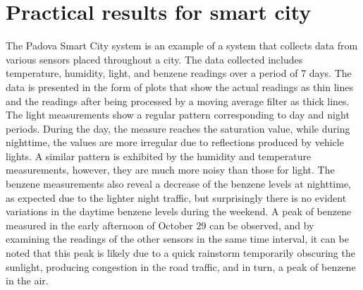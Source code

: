 \documentclass{article}
\begin{document}
\section{Practical results for smart city}
The Padova Smart City system is an example of a system that collects data from various sensors placed throughout a city. The data collected includes temperature, humidity, light, and benzene readings over a period of 7 days. The data is presented in the form of plots that show the actual readings as thin lines and the readings after being processed by a moving average filter as thick lines. The light measurements show a regular pattern corresponding to day and night periods. During the day, the measure reaches the saturation value, while during nighttime, the values are more irregular due to reflections produced by vehicle lights. A similar pattern is exhibited by the humidity and temperature measurements, however, they are much more noisy than those for light. The benzene measurements also reveal a decrease of the benzene levels at nighttime, as expected due to the lighter night traffic, but surprisingly there is no evident variations in the daytime benzene levels during the weekend. A peak of benzene measured in the early afternoon of October 29 can be observed, and by examining the readings of the other sensors in the same time interval, it can be noted that this peak is likely due to a quick rainstorm temporarily obscuring the sunlight, producing congestion in the road traffic, and in turn, a peak of benzene in the air.
\end{document}
